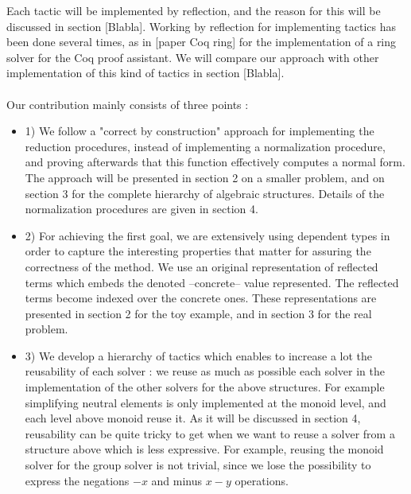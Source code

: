 Each tactic will be implemented by reflection, and the reason for this will be discussed in section [Blabla]. Working by reflection for implementing tactics has been done several times, as in [paper Coq ring] for the implementation of a ring solver for the Coq proof assistant. We will compare our approach with other implementation of this kind of tactics in section [Blabla]. \\
\\
Our contribution mainly consists of three points :
\begin{itemize}
	\item 1) We follow a "correct by construction" approach for implementing the reduction procedures, instead of implementing a normalization procedure, and proving afterwards that this function effectively computes a normal form. The approach will be presented in section 2 on a smaller problem, and on section 3 for the complete hierarchy of algebraic structures. Details of the normalization procedures are given in section 4.
	\item 2) For achieving the first goal, we are extensively using dependent types in order to capture the interesting properties that matter for assuring the correctness of the method. We use an original representation of reflected terms which embeds the denoted --concrete-- value represented. The reflected terms become indexed over the concrete ones. These representations are presented in section 2 for the toy example, and in section 3 for the real problem.
	\item 3) We develop a hierarchy of tactics which enables to increase a lot the reusability of each solver : we reuse as much as possible each solver in the implementation of the other solvers for the above structures. For example simplifying neutral elements is only implemented at the monoid level, and each level above monoid reuse it. As it will be discussed in section 4, reusability can be quite tricky to get when we want to reuse a solver from a structure above which is less expressive. For example, reusing the monoid solver for the group solver is not trivial, since we lose the possibility to express the negations $-x$ and minus $x-y$ operations.
\end{itemize}